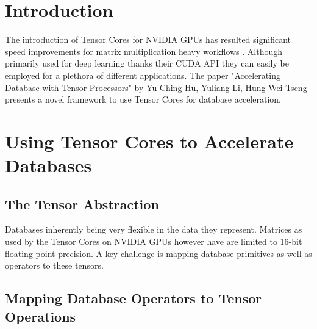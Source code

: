 \documentclass{paper}
\title{\titleVar}
\author{David R. Zollikofer\\ ETH Zürich}
\date{\today}
\begin{document}
	

	

\section{Introduction}
The introduction of Tensor Cores for NVIDIA GPUs has resulted significant speed improvements for matrix multiplication heavy workflows \cite{markidis2018nvidia}. Although primarily used for deep learning thanks their CUDA API they can easily be employed for a plethora of different applications. The paper "Accelerating Database with Tensor Processors" by Yu-Ching Hu, Yuliang Li, Hung-Wei Tseng \cite{hu2021tcudb} presents a novel framework to use Tensor Cores for database acceleration.
	
	\section{Using Tensor Cores to Accelerate Databases}
	
	\subsection{The Tensor Abstraction}
	Databases inherently being very flexible in the data they represent. Matrices as used by the Tensor Cores on NVIDIA GPUs however have are limited to 16-bit floating point precision. A key challenge is mapping database primitives as well as operators to these tensors.
	
	\subsection{Mapping Database Operators to Tensor Operations} \label{sec:map}
	
\end{document}
